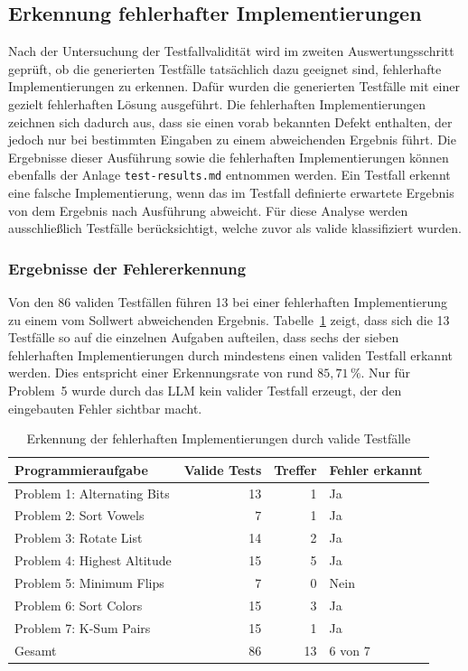 \subsection{Erkennung fehlerhafter Implementierungen}
Nach der Untersuchung der Testfallvalidität wird im zweiten Auswertungsschritt geprüft, ob die
generierten Testfälle tatsächlich dazu geeignet sind, fehlerhafte Implementierungen zu
erkennen. Dafür wurden die generierten Testfälle mit einer gezielt fehlerhaften Lösung ausgeführt. 
Die fehlerhaften Implementierungen zeichnen sich dadurch aus, dass sie einen vorab bekannten Defekt enthalten, 
der jedoch nur bei bestimmten Eingaben zu einem abweichenden Ergebnis führt.
Die Ergebnisse dieser Ausführung sowie die fehlerhaften Implementierungen können ebenfalls der Anlage \texttt{test-results.md} entnommen werden.
Ein Testfall erkennt eine falsche Implementierung, wenn das im Testfall definierte erwartete Ergebnis 
von dem Ergebnis nach Ausführung abweicht. Für diese Analyse werden ausschließlich Testfälle berücksichtigt, 
welche zuvor als valide klassifiziert wurden. 

\subsubsection{Ergebnisse der Fehlererkennung}
Von den 86 validen Testfällen führen 13 bei einer fehlerhaften Implementierung zu einem vom
Sollwert abweichenden Ergebnis. Tabelle~\ref{tab:fehlererkennung-probleme} zeigt, dass sich die 
13 Testfälle so auf die einzelnen Aufgaben aufteilen, dass sechs der sieben fehlerhaften Implementierungen 
durch mindestens einen validen Testfall erkannt werden. Dies entspricht einer Erkennungsrate von rund
\(85{,}71\,\%\). Nur für Problem~5 wurde durch das \ac{LLM} kein valider Testfall erzeugt, der den eingebauten
Fehler sichtbar macht.

\begin{table}[htbp]
    \centering
    \renewcommand{\arraystretch}{1.15}
    \caption{Erkennung der fehlerhaften Implementierungen durch valide Testfälle}
    \begin{tabular}{p{} r r l}
        \hline
        Programmieraufgabe &
        Valide Tests &
        Treffer &
        Fehler erkannt \\
        \hline
        Problem 1: Alternating Bits & 13 & 1 & Ja \\
        Problem 2: Sort Vowels & 7 & 1 & Ja \\
        Problem 3: Rotate List & 14 & 2 & Ja \\
        Problem 4: Highest Altitude & 15 & 5 & Ja \\
        Problem 5: Minimum Flips & 7 & 0 & Nein \\
        Problem 6: Sort Colors & 15 & 3 & Ja \\
        Problem 7: K-Sum Pairs & 15 & 1 & Ja \\
        \hline
        Gesamt & 86 & 13 & 6 von 7 \\
        \hline
    \end{tabular}
    
    \label{tab:fehlererkennung-probleme}
\end{table}

